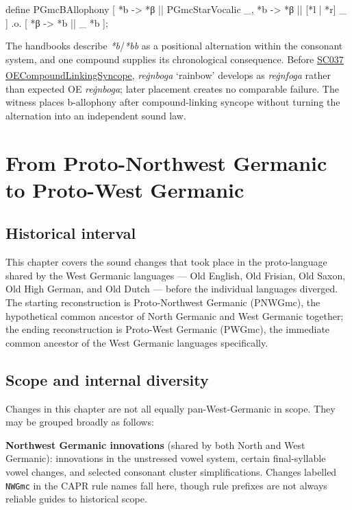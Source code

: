 \documentclass[
  british,
  a4paper,
  openany]{book}
\providecommand{\Pred}[1]{\textsuperscript{\dag}\emph{#1}}
\providecommand{\Pred}[1]{\textsuperscript{\dag}\emph{#1}}
\begin{document}
\begin{ReaderFacingFoma}
define PGmcBAllophony [
    {*b} -> {*β} || PGmcStarVocalic _,
    {*b} -> {*β} || [{*l} | {*r}] _
] .o. [
    {*β} -> {*b} || _ {*b}
];
\end{ReaderFacingFoma}

The handbooks describe \emph{*b}/\emph{*bb} as a positional alternation
within the consonant system, and one compound supplies its chronological
consequence. Before \hyperref[rule-OECompoundLinkingSyncope]{SC037
OECompoundLinkingSyncope}, \emph{reġnboga} `rainbow' develops as
\Pred{reġnfoga} rather than expected OE \emph{reġnboga}; later placement
creates no comparable failure. The witness places b-allophony after
compound-linking syncope without turning the alternation into an
independent sound law.

\newpage

\chapter{From Proto-Northwest Germanic to Proto-West
Germanic}\label{from-proto-northwest-germanic-to-proto-west-germanic}

\section{Historical interval}\label{historical-interval-1}

This chapter covers the sound changes that took place in the
proto-language shared by the West Germanic languages --- Old English,
Old Frisian, Old Saxon, Old High German, and Old Dutch --- before the
individual languages diverged. The starting reconstruction is
Proto-Northwest Germanic (PNWGmc), the hypothetical common ancestor of
North Germanic and West Germanic together; the ending reconstruction is
Proto-West Germanic (PWGmc), the immediate common ancestor of the West
Germanic languages specifically.

\section{Scope and internal
diversity}\label{scope-and-internal-diversity}

Changes in this chapter are not all equally pan-West-Germanic in scope.
They may be grouped broadly as follows:

\textbf{Northwest Germanic innovations} (shared by both North and West
Germanic): innovations in the unstressed vowel system, certain
final-syllable vowel changes, and selected consonant cluster
simplifications. Changes labelled \texttt{NWGmc} in the CAPR rule names
fall here, though rule prefixes are not always reliable guides to
historical scope.
\end{document}
